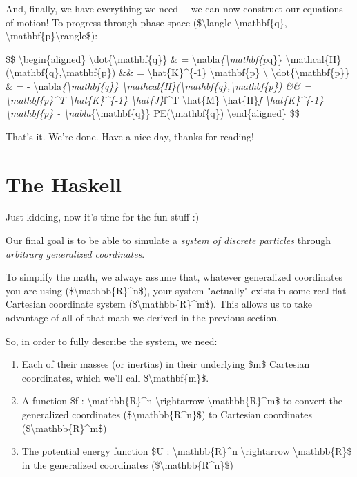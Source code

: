 \documentclass[]{article}
\begin{document}
And, finally, we have everything we need -\/- we can now construct our equations
of motion! To progress through phase space (\$\textbackslash{}langle
\textbackslash{}mathbf\{q\},
\textbackslash{}mathbf\{p\}\textbackslash{}rangle\$):

\$\$ \textbackslash{}begin\{aligned\}
\textbackslash{}dot\{\textbackslash{}mathbf\{q\}\} \& =
\textbackslash{}nabla\emph{\{\textbackslash{}mathbf\{p}q\}\}
\textbackslash{}mathcal\{H\}(\textbackslash{}mathbf\{q\},\textbackslash{}mathbf\{p\})
\&\& = \textbackslash{}hat\{K\}\^{}\{-1\} \textbackslash{}mathbf\{p\}
\textbackslash{} \textbackslash{}dot\{\textbackslash{}mathbf\{p\}\} \& = -
\textbackslash{}nabla\emph{\{\textbackslash{}mathbf\{q\}\}
\textbackslash{}mathcal\{H\}(\textbackslash{}mathbf\{q\},\textbackslash{}mathbf\{p\})
\&\& = \textbackslash{}mathbf\{p\}\^{}T \textbackslash{}hat\{K\}\^{}\{-1\}
\textbackslash{}hat\{J\}}f\^{}T \textbackslash{}hat\{M\}
\textbackslash{}hat\{H\}\emph{f \textbackslash{}hat\{K\}\^{}\{-1\}
\textbackslash{}mathbf\{p\} -
\textbackslash{}nabla}\{\textbackslash{}mathbf\{q\}\}
PE(\textbackslash{}mathbf\{q\}) \textbackslash{}end\{aligned\} \$\$

That's it. We're done. Have a nice day, thanks for reading!

\section{The Haskell}

Just kidding, now it's time for the fun stuff :)

Our final goal is to be able to simulate a \emph{system of discrete particles}
through \emph{arbitrary generalized coordinates}.

To simplify the math, we always assume that, whatever generalized coordinates
you are using (\$\textbackslash{}mathbb\{R\}\^{}n\$), your system "actually"
exists in some real flat Cartesian coordinate system
(\$\textbackslash{}mathbb\{R\}\^{}m\$). This allows us to take advantage of all
of that math we derived in the previous section.

So, in order to fully describe the system, we need:

\begin{enumerate}
\tightlist
\item
  Each of their masses (or inertias) in their underlying \$m\$ Cartesian
  coordinates, which we'll call \$\textbackslash{}mathbf\{m\}\$.
\item
  A function \$f : \textbackslash{}mathbb\{R\}\^{}n \textbackslash{}rightarrow
  \textbackslash{}mathbb\{R\}\^{}m\$ to convert the generalized coordinates
  (\$\textbackslash{}mathbb\{R\^{}n\}\$) to Cartesian coordinates
  (\$\textbackslash{}mathbb\{R\}\^{}m\$)
\item
  The potential energy function \$U : \textbackslash{}mathbb\{R\}\^{}n
  \textbackslash{}rightarrow \textbackslash{}mathbb\{R\}\$ in the generalized
  coordinates (\$\textbackslash{}mathbb\{R\^{}n\}\$)
\end{enumerate}
\end{document}
